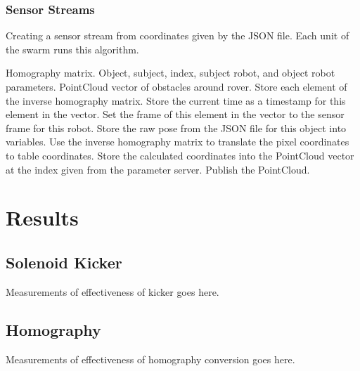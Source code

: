 \documentclass{article}
\begin{document}
          \subsubsection{Sensor Streams}
          \lipsum[1]
          \begin{algorithm}[H]
               \caption[Sensor Streams]{Creating a sensor stream from coordinates given by the JSON file. Each unit of the swarm runs this algorithm.}
               \label{alg:sensor_streams}
               \begin{algorithmic}[1]
                    \REQUIRE Homography matrix. Object, subject, index, subject robot, and object robot parameters.
                    \ENSURE PointCloud vector of obstacles around rover.
                    \STATE Store each element of the inverse homography matrix.
                    \ENDFOR
                    \STATE Store the current time as a timestamp for this element in the vector.
                    \STATE Set the frame of this element in the vector to the sensor frame for this robot.
                    \STATE Store the raw pose from the JSON file for this object into variables.
                    \STATE Use the inverse homography matrix to translate the pixel coordinates to table coordinates.
                    \STATE Store the calculated coordinates into the PointCloud vector at the index given from the parameter server.
                    \STATE Publish the PointCloud.
                    \ENDFOR
               \end{algorithmic}
          \end{algorithm}


     \section{Results}
     \lipsum[1]
          \subsection{Solenoid Kicker}
          Measurements of effectiveness of kicker goes here.
          \lipsum[1]
          \subsection{Homography}
          Measurements of effectiveness of homography conversion goes here.
          \lipsum[1]
\end{document}
